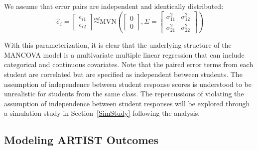 \documentclass[11pt]{isuthesis}\usepackage[]{graphicx}\usepackage[]{color}
\newcommand{\distas}[1]{\mathbin{\overset{#1}{\sim}}}%
\newcommand{\km}[1]{{\color{red} #1}}
\begin{document}
We assume that error pairs are independent and identically distributed:
\[
\vec{\epsilon}_{i} = 
\begin{bmatrix}
  \epsilon_{i1} \\ \epsilon_{i2} 
 \end{bmatrix}  
 \distas{iid} \text{MVN} \left( 
 \begin{bmatrix}
  0 \\ 0 
 \end{bmatrix},
 \Sigma = \begin{bmatrix}
  \sigma_{11}^2 & \sigma_{12}^2 \\ 
  \sigma_{21}^2 & \sigma_{22}^2
 \end{bmatrix}
 \right)
\]

% 
% 

With this parameterization, it is clear that the underlying structure of the MANCOVA model is a multivariate multiple linear regression that can include categorical and continuous covariates. Note that the paired error terms from each student are correlated but are specified as independent between students. The assumption of independence between student response scores is understood to be unrealistic for students from the same class. \km{The repercussions of violating the assumption of independence between student responses will be explored through a simulation study in Section~\ref{SimStudy} following the analysis.}

\subsection{Modeling ARTIST Outcomes}
\label{ArtistModel}
\end{document}

